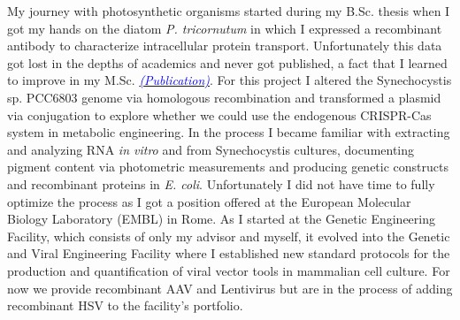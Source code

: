 \documentclass[11pt,a4paper,sans]{moderncv}
\begin{document}
\begin{spacing}{1.15}
My journey with photosynthetic organisms started during my B.Sc. thesis when I got my hands on the diatom \textit{P. tricornutum} in which I expressed a recombinant antibody to characterize intracellular protein transport. %
Unfortunately this data got lost in the depths of academics and never got published, a fact that I learned to improve in my M.Sc. {\href{https://www.ncbi.nlm.nih.gov/pubmed/29517395}{\textcolor{blue}{{\textit{(Publication)}}}}}. %
For this project I altered the Synechocystis sp. PCC6803 genome via homologous recombination and transformed a plasmid via conjugation to explore whether we could use the endogenous CRISPR-Cas system in metabolic engineering. 
In the process I became familiar with extracting and analyzing RNA \textit{in vitro} and from Synechocystis cultures, documenting pigment content via photometric measurements and producing genetic constructs and recombinant proteins in \textit{E. coli}. 
Unfortunately I did not have time to fully optimize the process as I got a position offered at the European Molecular Biology Laboratory (EMBL) in Rome.
As I started at the Genetic Engineering Facility, which consists of only my advisor and myself, it evolved into the Genetic and Viral Engineering Facility where I established new standard protocols for the production and quantification of viral vector tools in mammalian cell culture. For now we provide recombinant AAV and Lentivirus but are in the process of adding recombinant HSV to the facility's portfolio.\par


\end{spacing}
\end{document}
